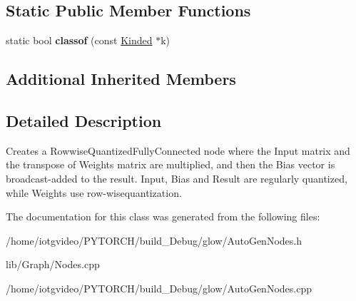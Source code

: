\subsection*{Static Public Member Functions}
\begin{DoxyCompactItemize}
\item 
\mbox{\label{classglow_1_1_rowwise_quantized_fully_connected_node_a90d060e487dc45bd521c86e4c03f8019}} 
static bool {\bfseries classof} (const \hyperlink{classglow_1_1_kinded}{Kinded} $\ast$k)
\end{DoxyCompactItemize}
\subsection*{Additional Inherited Members}


\subsection{Detailed Description}
Creates a Rowwise\+Quantized\+Fully\+Connected node where the Input matrix and the transpose of Weights matrix are multiplied, and then the Bias vector is broadcast-\/added to the result. Input, Bias and Result are regularly quantized, while Weights use row-\/wisequantization. 

The documentation for this class was generated from the following files\+:\begin{DoxyCompactItemize}
\item 
/home/iotgvideo/\+P\+Y\+T\+O\+R\+C\+H/build\+\_\+\+Debug/glow/Auto\+Gen\+Nodes.\+h\item 
lib/\+Graph/Nodes.\+cpp\item 
/home/iotgvideo/\+P\+Y\+T\+O\+R\+C\+H/build\+\_\+\+Debug/glow/Auto\+Gen\+Nodes.\+cpp\end{DoxyCompactItemize}
